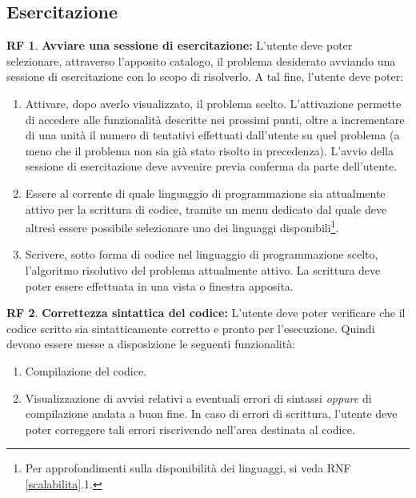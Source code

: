 \documentclass[11pt, a4paper]{article}
\theoremstyle{definition}
\newtheorem{funcreq}{RF} %
\begin{document}
\subsection{Esercitazione}
\begin{funcreq}
\textbf{Avviare una sessione di esercitazione:}
L'utente deve poter selezionare, attraverso l'apposito catalogo, il
problema desiderato avviando una sessione di esercitazione con lo scopo
di risolverlo. A tal fine, l'utente deve poter:
\begin{enumerate}
    \item Attivare, dopo averlo visualizzato, il problema scelto. L'attivazione permette di accedere alle funzionalità descritte nei prossimi punti, oltre a incrementare di una unità il numero di tentativi
    effettuati dall'utente su quel problema (a meno che il problema non
    sia già stato risolto in precedenza). L'avvio della sessione di
    esercitazione deve avvenire previa conferma da parte dell'utente.
    
    \item Essere al corrente di quale linguaggio di programmazione sia
    attualmente attivo per la scrittura di codice, tramite un menu dedicato
    dal quale deve altresì essere possibile selezionare uno dei linguaggi
    disponibili\footnote{Per approfondimenti sulla disponibilità dei linguaggi, si veda RNF \ref{scalabilita}.1.}.
    
    \item Scrivere, sotto forma di codice nel linguaggio di programmazione
    scelto, l'algoritmo risolutivo del problema attualmente attivo. La
    scrittura deve poter essere effettuata in una vista o finestra apposita.
\end{enumerate}
\end{funcreq}

\begin{funcreq}
\textbf{Correttezza sintattica del codice:}
L'utente deve poter verificare che il codice scritto sia sintatticamente
corretto e pronto per l'esecuzione. Quindi devono essere messe a disposizione
le seguenti funzionalità:
\begin{enumerate}
    \item Compilazione del codice.
    \item Visualizzazione di avvisi relativi a eventuali errori di sintassi
    \textit{oppure} di compilazione andata a buon fine. In caso di errori
    di scrittura, l'utente deve poter correggere tali errori riscrivendo
    nell'area destinata al codice.
\end{enumerate}
\end{funcreq}
\end{document}
